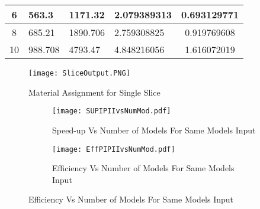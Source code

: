 \begin{table}[]
\begin{tabular}{|c|l|l|l|c|}
6                                                                                                                            & 563.3                                                                                                                                                                    & 1171.32                                                                                                                                    & 2.079389313                            & 0.693129771         \\ \hline
8                                                                                                                            & 685.21                                                                                                                                                                   & 1890.706                                                                                                                                   & 2.759308825                            & 0.919769608         \\ \hline
10                                                                                                                           & 988.708                                                                                                                                                                  & 4793.47                                                                                                                                    & 4.848216056                            & 1.616072019         \\ \hline
\end{tabular}
\end{table}

\begin{figure}[t]
\centering
\texttt{[image: SliceOutput.PNG]}
\caption{Material Assignment for Single Slice}
\label{fig:SliceOutput}
\end{figure}

\begin{figure}
\centering
\begin{subfigure}
\centering
\captionsetup[subfigure]{labelformat=empty}
\texttt{[image: SUPIPIIvsNumMod.pdf]}
\caption{Speed-up Vs Number of Models For Same Models Input}
\label{fig:SUPIPIIvsNumMod}
\end{subfigure}
\begin{subfigure}
\centering
\texttt{[image: EffPIPIIvsNumMod.pdf]}
\caption{Efficiency Vs Number of Models For Same Models Input}
\label{fig:EffPIPIIvsNumMod}
\end{subfigure}
\end{figure}


